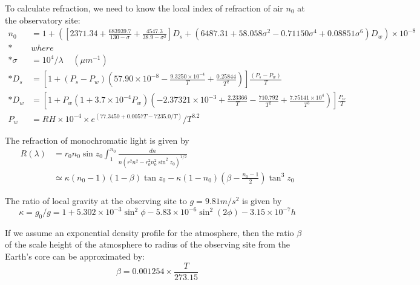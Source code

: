 \documentclass[]{article}
\begin{document}
To calculate refraction, we need to know the local index of refraction of air $n_0$ at the observatory site:
\begin{align}
	n_0 &=1 + \left(\left[2371.34 +\frac{683939.7}{130 - \sigma} +\frac{4547.3}{38.9 - \sigma^2}\right] D_s + \left(6487.31 + 58.058 \sigma^2 - 0.71150 \sigma^4 +0.08851 \sigma^6\right) D_w \label{eqn:index_refraction}\right)\times 10^{-8}\\*
	& where \nonumber\\*
	\sigma &= 10^4 /\lambda \;\;\;\;\left(\mu m^{-1}\right)\nonumber \\*
	D_s &= \left[1 + (P_s-P_w) \left(57.90\times10^{-8} - \frac{9.3250\times10^{-4}}{T}+\frac{0.25844}{T^2}\right)\right] \frac{(P_s-P_w)}{T} \nonumber \\*
	D_w &= \left[1 + P_w \left(1 + 3.7\times10^{-4} P_w\right)\left(-2.37321\times10^{-3} + \frac{2.23366}{T} - \frac{710.792}{T^2} + \frac{7.75141\times10^4}{T^3}\right)\right] \frac{P_w}{T} \nonumber \\
	P_w &= RH\times 10^{-4} \times e^{(77.3450 + 0.0057 T - 7235.0/T)}/T^{8.2} \nonumber
\end{align}


The refraction of monochromatic light is given by
\begin{align}
	R(\lambda) &= r_0 n_0 \sin z_0 \int_1^{n_0} \frac{dn}{n \left(r^2n^2 -r_0^2n_0^2\sin^2z_0\right)^{1/2}} \nonumber\\
	&\simeq \kappa (n_0 - 1) (1 - \beta) \tan z_0 - \kappa (1 - n_0) \left(\beta - \frac{n_0 - 1}{2}\right) \tan^3z_0
\end{align}

The ratio of local gravity at the observing site to $g = 9.81 m/s^2$ is given by
\begin{equation}
\kappa = g_0/g = 1 + 5.302\times 10^{-3} \sin^2\phi - 5.83\times 10^{-6} \sin^2(2\phi) - 3.15\times 10^{-7} h \nonumber
\end{equation}

If we assume an exponential density profile for the atmosphere, then the ratio $\beta$ of the scale height of the atmosphere to radius of the observing site from the Earth's core can be approximated by:
\begin{equation}
\beta = 0.001254 \times \frac{T}{273.15} \nonumber
\end{equation}



\end{document}
